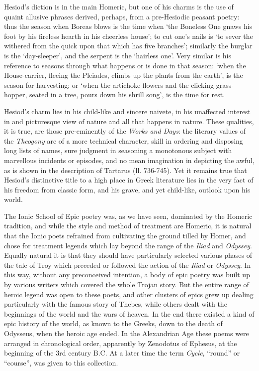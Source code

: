 Hesiod’s diction is in the main Homeric, but one of his charms is the use
of quaint allusive phrases derived, perhaps, from a pre-Hesiodic peasant
poetry: thus the season when Boreas blows is the time when ‘the Boneless
One gnaws his foot by his fireless hearth in his cheerless house’; to cut
one’s nails is ‘to sever the withered from the quick upon that
which has five branches’; similarly the burglar is the
‘day-sleeper’, and the serpent is the ‘hairless one’.
Very similar is his reference to seasons through what happens or is done in
that season: ‘when the House-carrier, fleeing the Pleiades, climbs up the
plants from the earth’, is the season for harvesting; or ‘when the
artichoke flowers and the clicking grass-hopper, seated in a tree, pours down
his shrill song’, is the time for rest.

Hesiod’s charm lies in his child-like and sincere naivete, in his
unaffected interest in and picturesque view of nature and all that happens in
nature. These qualities, it is true, are those pre-eminently of the \emph{Works
and Days}: the literary values of the \emph{Theogony} are of a more
technical character, skill in ordering and disposing long lists of names, sure
judgment in seasoning a monotonous subject with marvellous incidents or
episodes, and no mean imagination in depicting the awful, as is shown in the
description of Tartarus (ll. 736-745). Yet it remains true that Hesiod’s
distinctive title to a high place in Greek literature lies in the very fact of
his freedom from classic form, and his grave, and yet child-like, outlook upon
his world.


The Ionic School of Epic poetry was, as we have seen, dominated by the Homeric
tradition, and while the style and method of treatment are Homeric, it is
natural that the Ionic poets refrained from cultivating the ground tilled by
Homer, and chose for treatment legends which lay beyond the range of the
\emph{Iliad} and \emph{Odyssey}. Equally natural it is that they should have
particularly selected various phases of the tale of Troy which preceded or
followed the action of the \emph{Iliad} or \emph{Odyssey}. In this way, without
any preconceived intention, a body of epic poetry was built up by various
writers which covered the whole Trojan story. But the entire range of heroic
legend was open to these poets, and other clusters of epics grew up dealing
particularly with the famous story of Thebes, while others dealt with the
beginnings of the world and the wars of heaven. In the end there existed a kind
of epic history of the world, as known to the Greeks, down to the death of
Odysseus, when the heroic age ended. In the Alexandrian Age these poems were
arranged in chronological order, apparently by Zenodotus of Ephesus, at the
beginning of the 3rd century B.C. At a later time the term \emph{Cycle},
“round” or “course”, was given to this collection.

